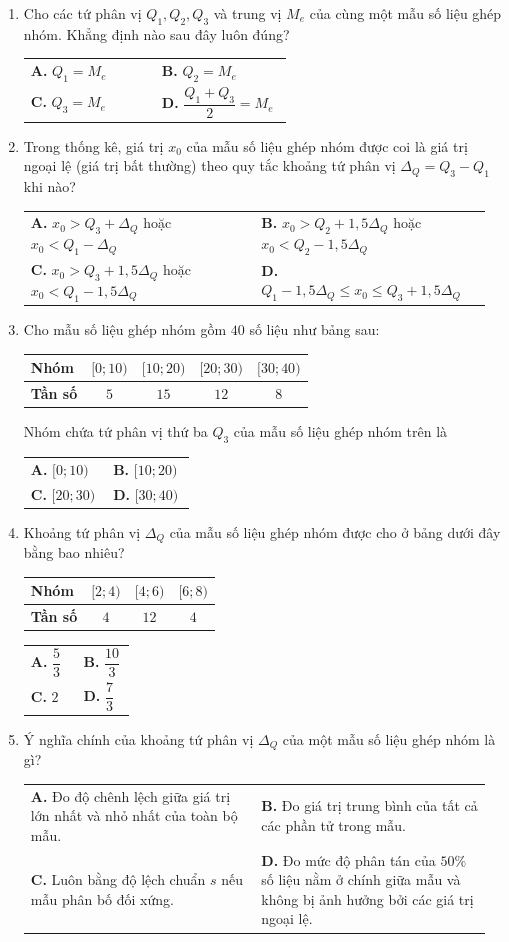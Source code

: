 \documentclass[12pt,a4paper]{article}
\makeatletter
\newcommand{\bonpa}[4]{\par\nobreak\smallskip\nobreak\noindent
\begin{tabular}{@{}p{0.48\linewidth}p{0.48\linewidth}@{}}
\textbf{A.} #1 & \textbf{B.} #2\\[7pt]
\textbf{C.} #3 & \textbf{D.} #4\end{tabular}}
\makeatother
\begin{document}
\begin{enumerate}
\item Cho các tứ phân vị $Q_1, Q_2, Q_3$ và trung vị $M_e$ của cùng một mẫu số liệu ghép nhóm. Khẳng định nào sau đây luôn đúng?
\bonpa{$Q_1 = M_e$}{$Q_2 = M_e$}{$Q_3 = M_e$}{$\dfrac{Q_1 + Q_3}{2} = M_e$}

\item Trong thống kê, giá trị $x_0$ của mẫu số liệu ghép nhóm được coi là giá trị ngoại lệ (giá trị bất thường) theo quy tắc khoảng tứ phân vị $\Delta_Q = Q_3 - Q_1$ khi nào?
\bonpa{$x_0 > Q_3 + \Delta_Q$ hoặc $x_0 < Q_1 - \Delta_Q$}{$x_0 > Q_2 + 1{,}5\Delta_Q$ hoặc $x_0 < Q_2 - 1{,}5\Delta_Q$}{$x_0 > Q_3 + 1{,}5\Delta_Q$ hoặc $x_0 < Q_1 - 1{,}5\Delta_Q$}{$Q_1 - 1{,}5\Delta_Q \le x_0 \le Q_3 + 1{,}5\Delta_Q$}

\item Cho mẫu số liệu ghép nhóm gồm $40$ số liệu như bảng sau:
\begin{center}
\begin{tabular}{|l|c|c|c|c|}
\hline
\textbf{Nhóm} & $[0; 10)$ & $[10; 20)$ & $[20; 30)$ & $[30; 40)$ \\ \hline
\textbf{Tần số} & $5$ & $15$ & $12$ & $8$ \\ \hline
\end{tabular}
\end{center}
Nhóm chứa tứ phân vị thứ ba $Q_3$ của mẫu số liệu ghép nhóm trên là
\bonpa{$[0; 10)$}{$[10; 20)$}{$[20; 30)$}{$[30; 40)$}

\item Khoảng tứ phân vị $\Delta_Q$ của mẫu số liệu ghép nhóm được cho ở bảng dưới đây bằng bao nhiêu?
\begin{center}
\begin{tabular}{|l|c|c|c|}
\hline
\textbf{Nhóm} & $[2; 4)$ & $[4; 6)$ & $[6; 8)$ \\ \hline
\textbf{Tần số} & $4$ & $12$ & $4$ \\ \hline
\end{tabular}
\end{center}
\bonpa{$\dfrac{5}{3}$}{$\dfrac{10}{3}$}{$2$}{$\dfrac{7}{3}$}

\item Ý nghĩa chính của khoảng tứ phân vị $\Delta_Q$ của một mẫu số liệu ghép nhóm là gì?
\bonpa{Đo độ chênh lệch giữa giá trị lớn nhất và nhỏ nhất của toàn bộ mẫu.}{Đo giá trị trung bình của tất cả các phần tử trong mẫu.}{Luôn bằng độ lệch chuẩn $s$ nếu mẫu phân bố đối xứng.}{Đo mức độ phân tán của $50\%$ số liệu nằm ở chính giữa mẫu và không bị ảnh hưởng bởi các giá trị ngoại lệ.}


\end{enumerate}
\end{document}
